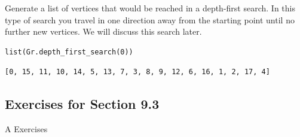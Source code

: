 \documentclass[10pt,]{book}
\theoremstyle{plain}
\theoremstyle{definition}
\theoremstyle{definition}
\theoremstyle{definition}
\theoremstyle{definition}
\theoremstyle{definition}
\numberwithin{equation}{section}
\begin{document}
\par
Generate a list of vertices that would be reached in a depth-first search.
 In this type of search you travel in one direction away from the starting point until no further new vertices. We will discuss this search later.%
\begin{lstlisting}[style=sageinput]
list(Gr.depth_first_search(0))
\end{lstlisting}
\begin{lstlisting}[style=sageoutput]
[0, 15, 11, 10, 14, 5, 13, 7, 3, 8, 9, 12, 6, 16, 1, 2, 17, 4]
\end{lstlisting}
\typeout{************************************************}
\typeout{************************************************}
\subsection[Exercises for Section 9.3]{Exercises for Section 9.3}\label{exercises-9-3}
\hypertarget{exercisegroup-3}{}\typeout{************************************************}
\typeout{************************************************}
A Exercises%
\end{document}
